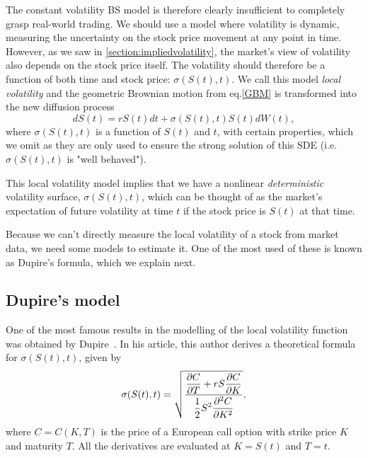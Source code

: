The constant volatility BS model is therefore clearly insufficient to completely grasp real-world trading. We should use a model where volatility is dynamic, measuring the uncertainty on the stock price movement at any point in time.
However, as we saw in \autoref{section:impliedvolatility}, the market's view of volatility also depends on the stock price itself.
The volatility should therefore be a function of both time and stock price: $\sigma(S(t),t)$. We call this model \emph{local volatility} and the geometric Brownian motion from eq.\eqref{GBM} is transformed into the new diffusion process
\begin{equation}\label{GBM2}
dS(t)=rS(t)dt+\sigma(S(t),t)S(t)dW(t),
\end{equation}
\noindent where $\sigma(S(t),t)$ is a function of $S(t)$ and $t$, with certain properties, which we omit as they are only used to ensure the strong solution of this SDE (i.e. $\sigma(S(t),t)$ is "well behaved").


This local volatility model implies that we have a nonlinear \emph{deterministic} volatility surface, $\sigma(S(t),t)$, which can be thought of as the market's expectation of future volatility at time $t$ if the stock price is $S(t)$ at that time.



Because we can't directly measure the local volatility of a stock from market data, we need some models to estimate it. One of the most used of these is known as Dupire's formula, which we explain next.


\subsection{Dupire's model}
\label{subsection:Dupire}
One of the most famous results in the modelling of the local volatility function was obtained by Dupire~\citep{Dupire}. In his article, this author derives a theoretical formula for $\sigma(S(t),t)$, given by
\begin{equation}\label{dupire}
\sigma(S(t),t)=\sqrt{\frac{\displaystyle\pdv{C}{T}+rS\pdv{C}{K}}{\displaystyle\frac{1}{2}S^2\pdv{^2C}{K^2}}},
\end{equation}
\noindent where $C=C(K,T)$ is the price of a European call option with strike price $K$ and maturity $T$. All the derivatives are evaluated at $K=S(t)$ and $T=t$.



